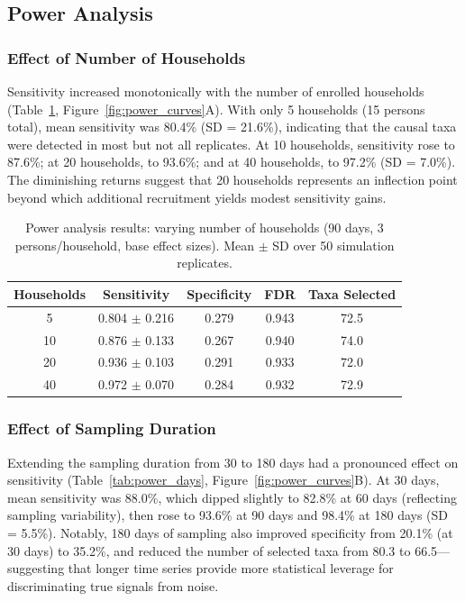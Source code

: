 \documentclass[11pt,letterpaper]{article}
\begin{document}
\subsection{Power Analysis}

\subsubsection{Effect of Number of Households}

Sensitivity increased monotonically with the number of enrolled households (Table~\ref{tab:power_households}, Figure~\ref{fig:power_curves}A). With only 5 households (15 persons total), mean sensitivity was 80.4\% (SD = 21.6\%), indicating that the causal taxa were detected in most but not all replicates. At 10 households, sensitivity rose to 87.6\%; at 20 households, to 93.6\%; and at 40 households, to 97.2\% (SD = 7.0\%). The diminishing returns suggest that 20 households represents an inflection point beyond which additional recruitment yields modest sensitivity gains.

\begin{table}[H]
\centering
\caption{Power analysis results: varying number of households (90 days, 3 persons/household, base effect sizes). Mean $\pm$ SD over 50 simulation replicates.}
\label{tab:power_households}
\begin{tabular}{@{}ccccc@{}}
\toprule
Households & Sensitivity & Specificity & FDR & Taxa Selected \\
\midrule
5  & 0.804 $\pm$ 0.216 & 0.279 & 0.943 & 72.5 \\
10 & 0.876 $\pm$ 0.133 & 0.267 & 0.940 & 74.0 \\
20 & 0.936 $\pm$ 0.103 & 0.291 & 0.933 & 72.0 \\
40 & 0.972 $\pm$ 0.070 & 0.284 & 0.932 & 72.9 \\
\bottomrule
\end{tabular}
\end{table}

\subsubsection{Effect of Sampling Duration}

Extending the sampling duration from 30 to 180 days had a pronounced effect on sensitivity (Table~\ref{tab:power_days}, Figure~\ref{fig:power_curves}B). At 30 days, mean sensitivity was 88.0\%, which dipped slightly to 82.8\% at 60 days (reflecting sampling variability), then rose to 93.6\% at 90 days and 98.4\% at 180 days (SD = 5.5\%). Notably, 180 days of sampling also improved specificity from 20.1\% (at 30 days) to 35.2\%, and reduced the number of selected taxa from 80.3 to 66.5---suggesting that longer time series provide more statistical leverage for discriminating true signals from noise.
\end{document}
